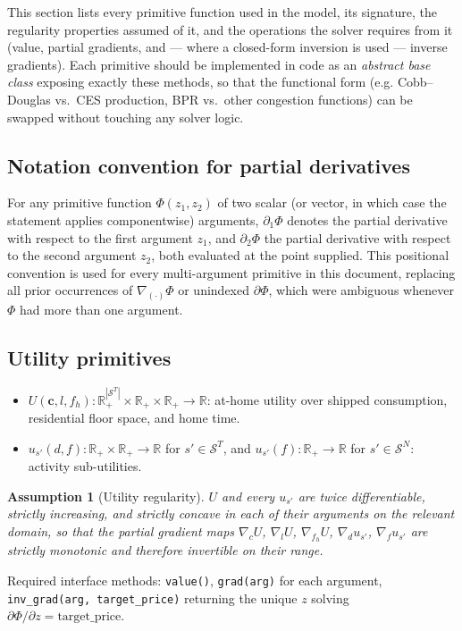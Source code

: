 \documentclass[11pt,a4paper]{article}
\newtheorem{assumption}{Assumption}
\begin{document}
This section lists every primitive function used in the model, its signature, the regularity properties assumed of it, and the operations the solver requires from it (value, partial gradients, and — where a closed-form inversion is used — inverse gradients). Each primitive should be implemented in code as an \emph{abstract base class} exposing exactly these methods, so that the functional form (e.g. Cobb--Douglas vs.\ CES production, BPR vs.\ other congestion functions) can be swapped without touching any solver logic.

\subsection{Notation convention for partial derivatives}
For any primitive function $\Phi(z_1, z_2)$ of two scalar (or vector, in which case the statement applies componentwise) arguments, $\partial_1 \Phi$ denotes the partial derivative with respect to the first argument $z_1$, and $\partial_2 \Phi$ the partial derivative with respect to the second argument $z_2$, both evaluated at the point supplied. This positional convention is used for every multi-argument primitive in this document, replacing all prior occurrences of $\nabla_{(\cdot)}\Phi$ or unindexed $\partial\Phi$, which were ambiguous whenever $\Phi$ had more than one argument.

\subsection{Utility primitives}
\begin{itemize}[leftmargin=*]
    \item $U(\mathbf{c}, l, f_h) : \mathbb{R}_+^{|\mathcal{S}^T|} \times \mathbb{R}_+ \times \mathbb{R}_+ \to \mathbb{R}$: at-home utility over shipped consumption, residential floor space, and home time.
    \item $u_{s'}(d, f) : \mathbb{R}_+\times\mathbb{R}_+ \to \mathbb{R}$ for $s' \in \mathcal{S}^T$, and $u_{s'}(f):\mathbb{R}_+\to\mathbb{R}$ for $s'\in\mathcal{S}^N$: activity sub-utilities.
\end{itemize}
\begin{assumption}[Utility regularity]
$U$ and every $u_{s'}$ are twice differentiable, strictly increasing, and strictly concave in each of their arguments on the relevant domain, so that the partial gradient maps $\nabla_c U$, $\nabla_l U$, $\nabla_{f_h} U$, $\nabla_d u_{s'}$, $\nabla_{f} u_{s'}$ are strictly monotonic and therefore invertible on their range.
\end{assumption}
Required interface methods: \texttt{value()}, \texttt{grad(arg)} for each argument, \texttt{inv\_grad(arg, target\_price)} returning the unique $z$ solving $\partial\Phi/\partial z = \text{target\_price}$.
\end{document}
